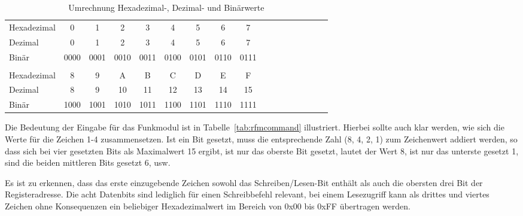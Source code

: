 \documentclass[paper=a4, parskip, numbers=noenddot, toc=listof, headsepline]{scrbook}
\begin{document}
				\begin{table}
					\begin{center}
						\begin{tabu}
							to .8
							\hline\hline
							Hexadezimal & 0    & 1    & 2    & 3    & 4    & 5    & 6    & 7    \\
							Dezimal     & 0    & 1    & 2    & 3    & 4    & 5    & 6    & 7    \\
							Binär       & 0000 & 0001 & 0010 & 0011 & 0100 & 0101 & 0110 & 0111 \\
							\\
							Hexadezimal & 8    & 9    & A    & B    & C    & D    & E    & F    \\
							Dezimal     & 8    & 9    & 10   & 11   & 12   & 13   & 14   & 15   \\
							Binär       & 1000 & 1001 & 1010 & 1011 & 1100 & 1101 & 1110 & 1111 \\ \hline\hline
						\end{tabu}
					\end{center}
					\caption{Umrechnung Hexadezimal-, Dezimal- und Binärwerte}
					\label{tab:zahlensysteme}
				\end{table}

				Die Bedeutung der Eingabe für das Funkmodul ist in Tabelle~\ref{tab:rfmcommand} illustriert. Hierbei sollte auch klar werden, wie sich die Werte für die Zeichen 1-4 zusammensetzen. Ist ein Bit gesetzt, muss die entsprechende Zahl (8, 4, 2, 1) zum Zeichenwert addiert werden, so dass sich bei vier gesetzten Bits als Maximalwert 15 ergibt, ist nur das oberste Bit gesetzt, lautet der Wert 8, ist nur das unterste gesetzt 1, sind die beiden mittleren Bits gesetzt 6, usw.

				Es ist zu erkennen, dass das erste einzugebende Zeichen sowohl das Schreiben/Lesen-Bit enthält als auch die obersten drei Bit der Registeradresse. Die acht Datenbits sind lediglich für einen Schreibbefehl relevant, bei einem Lesezugriff kann als drittes und viertes Zeichen ohne Konsequenzen ein beliebiger Hexadezimalwert im Bereich von 0x00 bis 0xFF übertragen werden.
\end{document}
